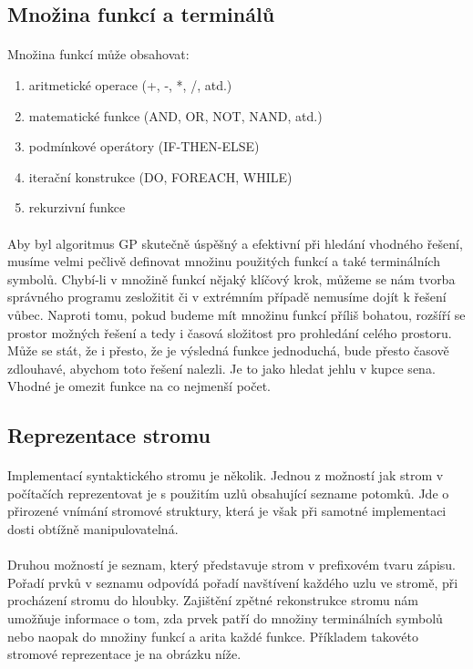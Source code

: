 \documentclass[bc,male,java,dept460]{diploma}		%
\begin{document}
\subsection{Množina funkcí a terminálů}
\paragraph*{}
Množina funkcí může obsahovat:
\begin{enumerate}
\item aritmetické operace (+, -, *, /, atd.)
\item matematické funkce (AND, OR, NOT, NAND, atd.)
\item podmínkové operátory (IF-THEN-ELSE)
\item iterační konstrukce (DO, FOREACH, WHILE)
\item rekurzivní funkce
\end{enumerate}

\paragraph*{}
Aby byl algoritmus GP skutečně úspěšný a efektivní při hledání vhodného řešení, musíme velmi pečlivě definovat množinu použitých funkcí a také terminálních symbolů. Chybí-li v množině funkcí nějaký klíčový krok, můžeme se nám tvorba správného programu zesložitit či v extrémním případě nemusíme dojít k řešení vůbec. Naproti tomu, pokud budeme mít množinu funkcí příliš bohatou, rozšíří se prostor možných řešení a tedy i časová složitost pro prohledání celého prostoru. Může se stát, že i přesto, že je výsledná funkce jednoduchá, bude přesto časově zdlouhavé, abychom toto řešení nalezli. Je to jako hledat jehlu v kupce sena. Vhodné je omezit funkce na co nejmenší počet.

\subsection{Reprezentace stromu}
\paragraph*{}
Implementací syntaktického stromu je několik. Jednou z možností jak strom v počítačích reprezentovat je s použitím uzlů obsahující sezname potomků. Jde o přirozené vnímání stromové struktury, která je však při samotné implementaci dosti obtížně manipulovatelná. 
\paragraph*{}
Druhou možností je seznam, který představuje strom v prefixovém tvaru zápisu. Pořadí prvků v seznamu odpovídá pořadí navštívení každého uzlu ve stromě, při procházení stromu do hloubky. Zajištění zpětné rekonstrukce stromu nám umožňuje informace o tom, zda prvek patří do množiny terminálních symbolů nebo naopak do množiny funkcí a arita každé funkce. Příkladem takovéto stromové reprezentace je na obrázku níže.
\end{document}

